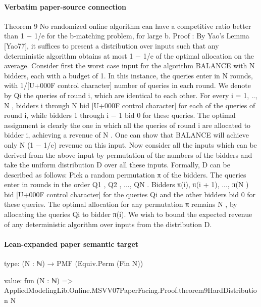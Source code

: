 \documentclass[10pt]{article}
\begin{document}
\paragraph{Verbatim paper-source connection}
\begin{ReviewVerbatim}
Theorem 9 No randomized online algorithm can have a competitive ratio better than 1 − 1/e
for the b-matching problem, for large b.
Proof : By Yao’s Lemma [Yao77], it suffices to present a distribution over inputs such that
any deterministic algorithm obtains at most 1 − 1/e of the optimal allocation on the average.
Consider first the worst case input for the algorithm BALANCE with N bidders, each with
a budget of 1. In this instance, the queries enter in N rounds, with 1/[U+000F control character] number of queries in
each round. We denote by Qi the queries of round i, which are identical to each other. For
every i = 1, .., N , bidders i through N bid [U+000F control character] for each of the queries of round i, while bidders 1
through i − 1 bid 0 for these queries. The optimal assignment is clearly the one in which all
the queries of round i are allocated to bidder i, achieving a revenue of N . One can show that
BALANCE will achieve only N (1 − 1/e) revenue on this input.
Now consider all the inputs which can be derived from the above input by permutation of the
numbers of the bidders and take the uniform distribution D over all these inputs. Formally, D
can be described as follows: Pick a random permutation π of the bidders. The queries enter
in rounds in the order Q1 , Q2 , ..., QN . Bidders π(i), π(i + 1), ..., π(N ) bid [U+000F control character] for the queries Qi
and the other bidders bid 0 for these queries. The optimal allocation for any permutation
π remains N , by allocating the queries Qi to bidder π(i). We wish to bound the expected
revenue of any deterministic algorithm over inputs from the distribution D.
\end{ReviewVerbatim}



\paragraph{Lean-expanded paper semantic target}
\begin{ReviewVerbatim}
type:
(N : ℕ) → PMF (Equiv.Perm (Fin N))

value:
fun (N : ℕ) => AppliedModelingLib.Online.MSVV07PaperFacing.Proof.theorem9HardDistribution N
\end{ReviewVerbatim}
\end{document}
